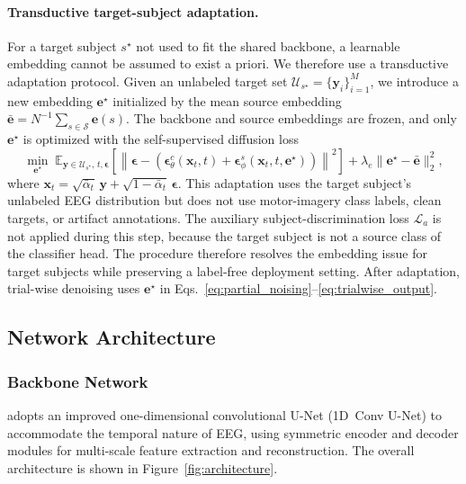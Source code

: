 \paragraph{Transductive target-subject adaptation.}
For a target subject $s^\star$ not used to fit the shared backbone, a learnable
embedding cannot be assumed to exist a priori. We therefore use a transductive
adaptation protocol. Given an unlabeled target set
$\mathcal{U}_{s^\star}=\{\mathbf{y}_i\}_{i=1}^{M}$, we introduce a new embedding
$\mathbf{e}^\star$ initialized by the mean source embedding
$\bar{\mathbf{e}}=N^{-1}\sum_{s\in\mathcal{S}}\mathbf{e}(s)$. The backbone and
source embeddings are frozen, and only $\mathbf{e}^\star$ is optimized with the
self-supervised diffusion loss
\begin{equation}
  \min_{\mathbf{e}^\star}\; 
  \mathbb{E}_{\mathbf{y}\in\mathcal{U}_{s^\star},\,t,\boldsymbol{\epsilon}}
  \left[\left\|\boldsymbol{\epsilon}-
  \left(
  \boldsymbol{\epsilon}^{c}_{\theta}(\mathbf{x}_t,t)
  +\boldsymbol{\epsilon}^{s}_{\phi}(\mathbf{x}_t,t,\mathbf{e}^\star)
  \right)\right\|^2\right]
  +\lambda_e\|\mathbf{e}^\star-\bar{\mathbf{e}}\|_2^2,
  \label{eq:target_embedding_adapt}
\end{equation}
where
$\mathbf{x}_t=\sqrt{\bar{\alpha}_t}\,\mathbf{y}+\sqrt{1-\bar{\alpha}_t}\,\boldsymbol{\epsilon}$.
This adaptation uses the target subject's unlabeled EEG distribution but does
not use motor-imagery class labels, clean targets, or artifact annotations. The
auxiliary subject-discrimination loss $\mathcal{L}_a$ is not applied during this
step, because the target subject is not a source class of the classifier head.
The procedure therefore resolves the embedding issue for target subjects while
preserving a label-free deployment setting. After adaptation, trial-wise
denoising uses $\mathbf{e}^\star$ in
Eqs.~\eqref{eq:partial_noising}--\eqref{eq:trialwise_output}.

\subsection{Network Architecture}
\label{sec:method_architecture}

\subsubsection{Backbone Network}
\saddpm{} adopts an improved one-dimensional convolutional U-Net (1D~Conv
U-Net) to accommodate the temporal nature of EEG, using symmetric encoder and
decoder modules for multi-scale feature extraction and reconstruction. The
overall architecture is shown in Figure~\ref{fig:architecture}.

